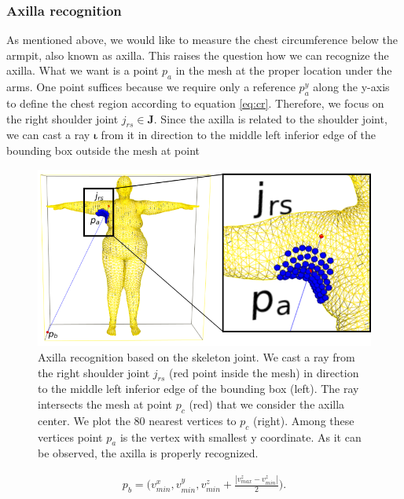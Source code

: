 \documentclass[runningheads, orivec]{llncs}
\begin{document}
\subsubsection{Axilla recognition}\label{subsec:armpit_recog}
As mentioned above, we would like to measure the chest circumference below the 
armpit, also known as axilla. This raises the question how we can recognize 
the axilla. What we want is a point $p_a$ in the mesh at the proper location 
under 
the arms. One point suffices because we require only a reference $p^y_a$ along 
the 
y-axis to define the chest region according to equation \ref{eq:cr}. Therefore, 
we focus on the right shoulder joint $j_{rs} \in \mathbf{J}$. Since the axilla 
is related to 
the shoulder joint, we can cast a ray $\boldsymbol{\iota}$ from it in direction 
to the middle left 
inferior edge of the bounding box outside the mesh at point

\begin{figure}[t]
	\begin{center}
		\includegraphics[width=\linewidth]{axilla_recognition_80_NN.png}
	\end{center}
	\caption{Axilla recognition based on the skeleton joint. We cast a ray from 
		the right shoulder joint $j_{rs}$ (red point inside the mesh) in direction to the middle left 
		inferior edge of the bounding box (left). The ray intersects the mesh 
		at point $p_c$ (red) that we consider the axilla center. We plot the 80 
		nearest vertices to $p_c$ (right). Among these vertices point $p_a$ is the vertex 
		with smallest y coordinate. As it can be observed, the axilla is 
		properly recognized.}
	\label{fig:axilla-recognition}
\end{figure}

\begin{align}
p_b = \bigg(v^x_{min}, v^y_{min}, v^z_{min} + 
\frac{|v^z_{max} - v^z_{min}|}{2}\bigg).
\end{align}
\end{document}
